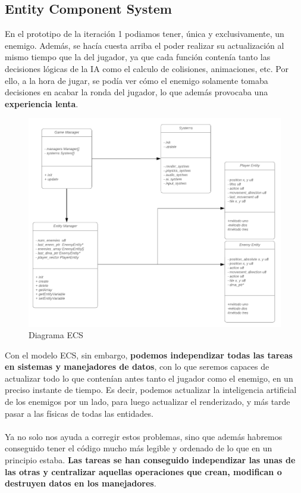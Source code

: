 \subsection{Entity Component System}

En el prototipo de la iteración 1 podiamos tener, única y exclusivamente, un enemigo. Además, se hacía cuesta arriba el poder realizar su actualización al mismo tiempo que la del jugador, ya que cada función contenía tanto las decisiones lógicas de la IA como el calculo de colisiones, animaciones, etc. Por ello, a la hora de jugar, se podía ver cómo el enemigo solamente tomaba decisiones en acabar la ronda del jugador, lo que además provocaba una \textbf{experiencia lenta}.

\begin{figure}[h]
\centering
\includegraphics[width=1\textwidth]{include/images/desarrollo/Diagrama.png}
\caption{Diagrama ECS}
\label{figure:ecs}
\end{figure}

Con el modelo ECS, sin embargo, \textbf{podemos independizar todas las tareas en sistemas y manejadores de datos}, con lo que seremos capaces de actualizar todo lo que contenían antes tanto el jugador como el enemigo, en un preciso instante de tiempo. Es decir, podemos actualizar la inteligencia artificial de los enemigos por un lado, para luego actualizar el renderizado, y más tarde pasar a las físicas de todas las entidades.
\\ \\
Ya no solo nos ayuda a corregir estos problemas, sino que además habremos conseguido tener el código mucho más legible y ordenado de lo que en un principio estaba. \textbf{Las tareas se han conseguido independizar las unas de las otras y centralizar aquellas operaciones que crean, modifican o destruyen datos en los manejadores}. \\

